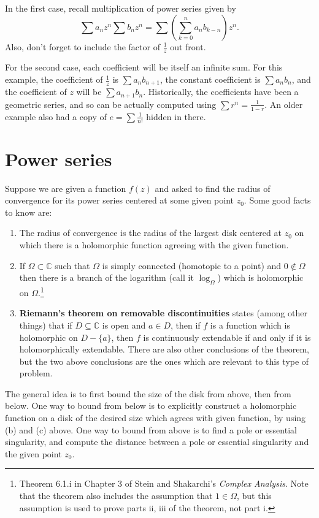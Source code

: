 \documentclass[10pt]{article}
\begin{document}
\begin{enumerate}
	In the first case, recall multiplication of power series given by \[\sum a_n z^n \sum b_n z^n = \sum (\sum_{k=0}^n a_n b_{k-n}) z^n.\] Also, don't forget to include the factor of $\frac{1}{z}$ out front. 
	
	For the second case, each coefficient will be itself an infinite sum. For this example, the coefficient of $\frac{1}{z}$ is $\sum a_n b_{n+1}$, the constant coefficient is $\sum a_n b_n$, and the coefficient of $z$ will be $\sum a_{n+1}b_n$. Historically, the coefficients have been a geometric series, and so can be actually computed using $\sum r^n = \frac{1}{1-r}$. An older example also had a copy of $e =  \sum \frac{1}{n!}$ hidden in there.
\end{enumerate}

\section{Power series}
Suppose we are given a function $f(z)$ and asked to find the radius of convergence for its power series centered at some given point $z_0$. Some good facts to know are:
\begin{enumerate}[label = \alph*)]
\item The radius of convergence is the radius of the largest disk centered at $z_0$ on which there is a holomorphic function agreeing with the given function.
\item If $\Omega \subset \mathbb{C}$ such that $\Omega$ is simply connected (homotopic to a point) and $0 \not \in \Omega$ then there is a branch of the logarithm (call it $\log_\Omega$) which is holomorphic on $\Omega$.\footnote{Theorem 6.1.i in Chapter 3 of Stein and Shakarchi's \textit{Complex Analysis}. Note that the theorem also includes the assumption that $1 \in \Omega$, but this assumption is used to prove parts ii, iii of the theorem, not part i.}
\item \textbf{Riemann's theorem on removable discontinuities} states (among other things) that if $D \subseteq \mathbb{C}$ is open and $a \in D$, then if $f$ is a function which is holomorphic on $D-\{a\}$, then $f$ is continuously extendable if and only if it is holomorphically extendable. There are also other conclusions of the theorem, but the two above conclusions are the ones which are relevant to this type of problem.
\end{enumerate}

The general idea is to first bound the size of the disk from above, then from below. One way to bound from below is to explicitly construct a holomorphic function on a disk of the desired size which agrees with given function, by using (b) and (c) above.
One way to bound from above is to find a pole or essential singularity, and compute the distance between a pole or essential singularity and the given point $z_0$.
\end{document}
